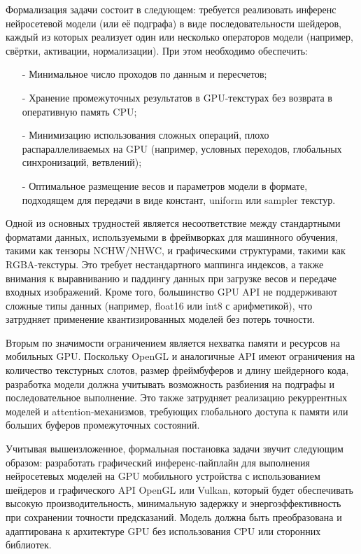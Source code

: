 \documentclass[a4paper,14pt]{extreport}
\begin{document}
        Формализация задачи состоит в следующем: требуется реализовать инференс нейросетевой модели (или её подграфа) в виде последовательности шейдеров, каждый из которых реализует один или несколько операторов модели (например, свёртки, активации, нормализации). При этом необходимо обеспечить:
        \begin{itemize}
            \item[-] Минимальное число проходов по данным и пересчетов;
            \item[-] Хранение промежуточных результатов в GPU-текстурах без возврата в оперативную память CPU;
            \item[-] Минимизацию использования сложных операций, плохо распараллеливаемых на GPU (например, условных переходов, глобальных синхронизаций, ветвлений);
            \item[-] Оптимальное размещение весов и параметров модели в формате, подходящем для передачи в виде констант, uniform или sampler текстур.
        \end{itemize}

        Одной из основных трудностей является несоответствие между стандартными форматами данных, используемыми в фреймворках для машинного обучения, такими как тензоры NCHW/NHWC, и графическими структурами, такими как RGBA-текстуры. Это требует нестандартного маппинга индексов, а также внимания к выравниванию и паддингу данных при загрузке весов и передаче входных изображений. Кроме того, большинство GPU API не поддерживают сложные типы данных (например, float16 или int8 с арифметикой), что затрудняет применение квантизированных моделей без потерь точности. 
        
        Вторым по значимости ограничением является нехватка памяти и ресурсов на мобильных GPU. Поскольку OpenGL и аналогичные API имеют ограничения на количество текстурных слотов, размер фреймбуферов и длину шейдерного кода, разработка модели должна учитывать возможность разбиения на подграфы и последовательное выполнение. Это также затрудняет реализацию рекуррентных моделей и attention-механизмов, требующих глобального доступа к памяти или больших буферов промежуточных состояний.
        
        Учитывая вышеизложенное, формальная постановка задачи звучит следующим образом: разработать графический инференс-пайплайн для выполнения нейросетевых моделей на GPU мобильного устройства с использованием шейдеров и графического API OpenGL или Vulkan, который будет обеспечивать высокую производительность, минимальную задержку и энергоэффективность при сохранении точности предсказаний. Модель должна быть преобразована и адаптирована к архитектуре GPU без использования CPU или сторонних библиотек.
        
\end{document}

